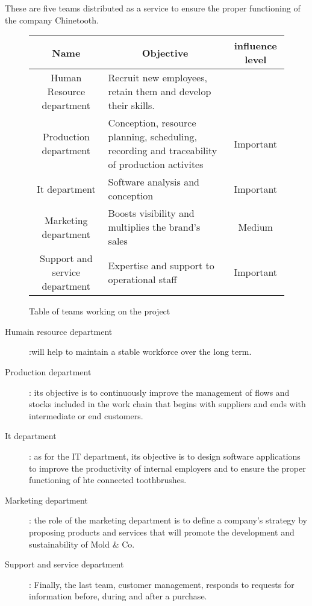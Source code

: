 These are five teams distributed as a service to ensure the proper functioning of the company Chinetooth.

\begin{figure}[h]
\centering
\begin{tabular}{| c | p{6cm} | c |}
    \hline
    \rowcolor{heading-color}Name & \multicolumn{1}{c|}{Objective} & influence level \\
    \hline
    Human Resource department & Recruit new employees, retain them and develop their skills. & \\
    \hline
    Production department & Conception, resource planning, scheduling, recording and traceability of production activites & Important \\
    \hline 
    It department & Software analysis and conception & Important \\
    \hline
    Marketing department & Boosts visibility and multiplies the brand's sales & Medium \\
    \hline 
    Support and service department & Expertise and support to operational staff & Important \\
    \hline
\end{tabular}
\caption{Table of teams working on the project}
\end{figure}

\begin{description}
    \item[Humain resource department]:will help to maintain a stable workforce over the long term.
    \item[Production department]: its objective is to continuously improve the management of flows and stocks included in the work chain that begins with suppliers and ends with intermediate or end customers.
    \item[It department]: as for the IT department, its objective is to design software applications to improve the productivity of internal employers and to ensure the proper functioning of hte connected toothbrushes.
    \item[Marketing department]: the role of the marketing department is to define a company's strategy by proposing products and services that will promote the development and sustainability of Mold \& Co.
    \item[Support and service department]: Finally, the last team, customer management, responds to requests for information before, during and after a purchase.   
\end{description} 
